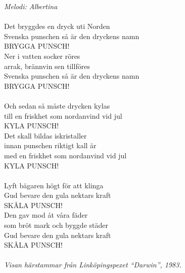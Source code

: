 {\footnotesize\textit{Melodi: Albertina}}\\
\\
Det bryggdes en dryck uti Norden\\
Svenska punschen så är den dryckens namn\\
BRYGGA PUNSCH!\\
Ner i vatten socker röres\\
arrak, brännvin sen tillföres\\
Svenska punschen så är den dryckens namn\\
BRYGGA PUNSCH!\\
\\
Och sedan så måste drycken kylas\\
till en friskhet som nordanvind vid jul\\
KYLA PUNSCH!\\
Det skall bildas iskristaller\\
innan punschen riktigt kall är\\
med en friskhet som nordanvind vid jul\\
KYLA PUNSCH!\\
\\
Lyft bägaren högt för att klinga\\
Gud bevare den gula nektars kraft\\
SKÅLA PUNSCH!\\
Den gav mod åt våra fäder\\
som bröt mark och byggde städer\\
Gud bevare den gula nektars kraft\\
SKÅLA PUNSCH!\\
\\
{\footnotesize\textit{Visan härstammar från Linköpingspexet ``Darwin'', 1983.}}
